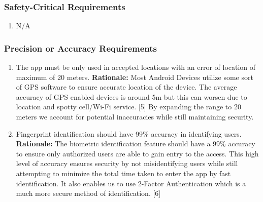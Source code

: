 \documentclass[]{article}
\begin{document}
\subsubsection{Safety-Critical Requirements}
\label{ssub:safety_critical_requirements}
\begin{enumerate}[{PR-SC}1. ]
	\item N/A
\end{enumerate}

\subsubsection{Precision or Accuracy Requirements}
\label{ssub:precision_or_accuracy_requirements}
\begin{enumerate}[{PR-PA}1. ]
	\item The app must be only used in accepted locations with an error of location of maximum of 20 meters. \newline
	      \textbf{Rationale:} Most Android Devices utilize some sort of GPS software to ensure accurate location of the device. The average accuracy of GPS enabled devices is around 5m but this can worsen due to location and spotty cell/Wi-Fi service. [5] By expanding the range to 20 meters we account for potential inaccuracies while still maintaining security.

	\item Fingerprint identification should have 99\% accuracy in identifying users. \newline
	      \textbf{Rationale:} The biometric identification feature should have a 99\% accuracy to ensure only authorized users are able to gain entry to the access. This high level of accuracy ensures security by not misidentifying users while still attempting to minimize the total time taken to enter the app by fast identification. It also enables us to use 2-Factor Authentication which is a much more secure method of identification. [6]

\end{enumerate}
\end{document}
